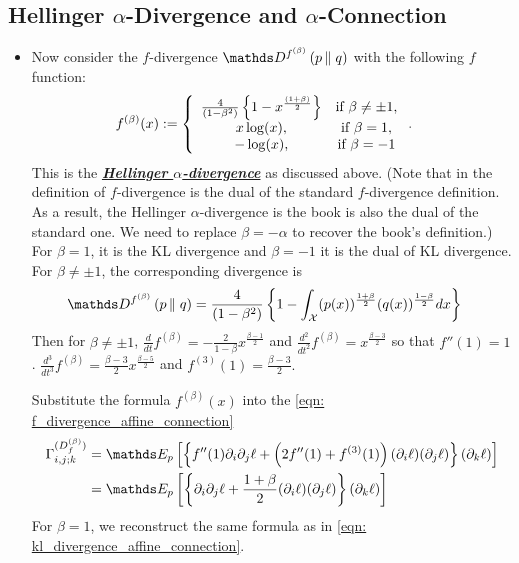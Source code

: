 \documentclass[11pt]{article}
\begin{document}
\subsection{Hellinger $\alpha$-Divergence and $\alpha$-Connection}
\begin{itemize}
\item Now consider the $f$-divergence $\divg{f^{(\beta)}}{p}{q}$ with the following $f$ function:
\begin{align*}
f^{(\beta)}(x) &:= \left\{ 
\begin{array}{cc}
\frac{4}{(1-\beta^2)} \set{1 - x^{\frac{(1+\beta)}{2}}}& \text{if}\ \beta\neq \pm 1, \\
    x\log(x), & \text{if}\ \beta=1, \\
    - \log(x), & \text{if}\ \beta=-1
\end{array}
\right..
\end{align*} This is the \underline{\emph{\textbf{Hellinger $\alpha$-divergence}}} as discussed above. (Note that in \citep{amari2007methods} the definition of $f$-divergence is the dual of the standard $f$-divergence definition. As a result, the Hellinger $\alpha$-divergence is the book is also the dual of the standard one. We need to replace \underline{$\beta = - \alpha$} to recover the book's definition.) For $\beta = 1$, it is the KL divergence and  $\beta = -1$ it is the dual of KL divergence. For $\beta \neq \pm 1$, the corresponding divergence is 
\begin{align*}
\divg{f^{(\beta)}}{p}{q} &=\frac{4}{(1-\beta^2)}\set{1 - \int_{\cX}(p(x))^{\frac{1+ \beta}{2}} (q(x))^{\frac{1 - \beta}{2}}dx } 
\end{align*}
Then for $\beta \neq \pm 1$, $\frac{d}{dt}f^{(\beta)} = - \frac{2}{1 - \beta} x^{\frac{\beta - 1}{2}} $ and  $\frac{d^2}{dt^2}f^{(\beta)} = x^{\frac{\beta - 3}{2}}$ so that $f''(1) = 1$. $\frac{d^3}{dt^3}f^{(\beta)} = \frac{\beta - 3}{2}x^{\frac{\beta - 5}{2}}$ and $f^{(3)}(1) = \frac{\beta - 3}{2}.$

Substitute the formula $f^{(\beta)}(x)$ into the \eqref{eqn: f_divergence_affine_connection}
\begin{align}
\Gamma_{i,j;k}^{(D_f^{(\beta)})} &=\E{p}{\set{f''(1)\partial_i \partial_j \ell + \paren{2f''(1) + f^{(3)}(1)}(\partial_i \ell)(\partial_j \ell)}(\partial_k \ell)} \nonumber\\
&=  \E{p}{\set{\partial_i \partial_j \ell +  \frac{1 + \beta}{2}(\partial_i \ell)(\partial_j \ell)}(\partial_k \ell)}  \label{eqn: hellinger_alpha_divergence_affine_connection}
\end{align}
For $\beta = 1$, we reconstruct the same formula as in \eqref{eqn: kl_divergence_affine_connection}.


\end{itemize}
\end{document}
